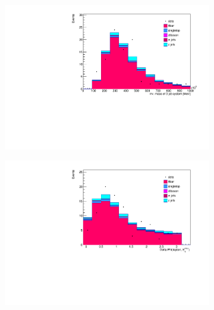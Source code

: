 \begin{figure}
  \begin{subfigure}{0.5\textwidth}
    \centering
    \includegraphics[width=\linewidth]{plots_and_txt/stacked_plots/stacked_3JetSys.pdf}
    \caption{}
    \label{fig:stacked_3jetsys}
  \end{subfigure}%
  \begin{subfigure}{0.5\textwidth}
    \centering
    \includegraphics[width=\linewidth]{plots_and_txt/stacked_plots/stacked_deltaphi.pdf}
    \caption{}
    \label{fig:stacked_deltaphi}
  \end{subfigure}%
  \newline
  \begin{subfigure}{0.5\textwidth}
    \centering

\end{subfigure}
\end{figure}
